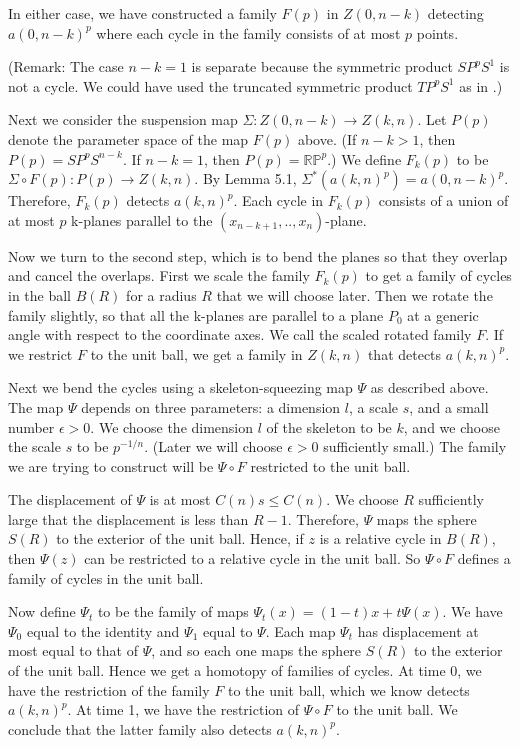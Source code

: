 \documentclass{amsart}
\newtheorem*{Theorem 1}{Theorem 1}
\newtheorem*{Theorem 2}{Theorem 2}
\newtheorem*{Theorem 1A}{Theorem 1A}
\newtheorem*{Theorem 2A}{Theorem 2A}
\newtheorem*{vanishing lemma}{Vanishing Lemma}
\numberwithin{equation}{section}
\begin{document}
In either case, we have constructed a family $F(p)$ in $Z(0,n-k)$
detecting $a(0,n-k)^p$ where each cycle in the family consists of
at most $p$ points.

(Remark: The case $n-k=1$ is separate because the symmetric
product $SP^p S^1$ is not a cycle.  We could have used the
truncated symmetric product $TP^p S^1$ as in \cite{M}.)

Next we consider the suspension map $\Sigma: Z(0,n-k) \rightarrow
Z(k,n)$.  Let $P(p)$ denote the parameter space of the map $F(p)$
above.  (If $n-k>1$, then $P(p) = SP^p S^{n-k}$. If $n-k=1$, then
$P(p) = \mathbb{RP}^p$.)  We define $F_k(p)$ to be $\Sigma \circ
F(p): P(p)
\rightarrow Z(k,n)$.  By Lemma 5.1, $\Sigma^*(a(k,n)^p) =
a(0,n-k)^p$.  Therefore,
$F_k(p)$ detects $a(k,n)^p$.  Each cycle in $F_k(p)$ consists of a union
of at most $p$ k-planes parallel to the $(x_{n-k+1}, .., x_n)$-plane.

Now we turn to the second step, which is to bend the planes so
that they overlap and cancel the overlaps.  First we scale the
family $F_k(p)$ to get a family of cycles in the ball $B(R)$ for
a radius $R$ that we will choose later.  Then we rotate the
family slightly, so that all the k-planes are parallel to a plane
$P_0$ at a generic angle with respect to the coordinate axes.  We
call the scaled rotated family $F$.  If we restrict $F$ to the
unit ball, we get a family in $Z(k,n)$ that detects $a(k,n)^p$.

Next we bend the cycles using a skeleton-squeezing map $\Psi$ as
described above. The map $\Psi$ depends on three parameters: a
dimension $l$, a scale $s$, and a small number $\epsilon > 0$. 
We choose the dimension $l$ of the skeleton to be $k$, and we
choose the scale $s$ to be $p^{-1/n}$.  (Later we will choose
$\epsilon > 0$ sufficiently small.) The family we are trying to
construct will be $\Psi \circ F$ restricted to the unit ball.

The displacement of $\Psi$ is at most $C(n) s \le C(n)$.  We
choose $R$ sufficiently large that the displacement is less than
$R-1$.  Therefore, $\Psi$ maps the sphere $S(R)$ to the exterior
of the unit ball.  Hence, if $z$ is a relative cycle in $B(R)$,
then $\Psi(z)$ can be restricted to a relative cycle in the unit
ball. So $\Psi \circ F$ defines a family of cycles in the unit
ball.

Now define $\Psi_t$ to be the family of maps $\Psi_t(x) = (1-t) x
+ t \Psi(x)$.  We have $\Psi_0$ equal to the identity and
$\Psi_1$ equal to $\Psi$.  Each map $\Psi_t$ has displacement at
most equal to that of $\Psi$, and so each one maps the sphere
$S(R)$ to the exterior of the unit ball.  Hence we get a homotopy
of families of cycles.  At time 0, we have the restriction of the
family $F$ to the unit ball, which we know detects $a(k,n)^p$. At
time 1, we have the restriction of $\Psi \circ F$ to the unit
ball.  We conclude that the latter family also detects
$a(k,n)^p$.
\end{document}
